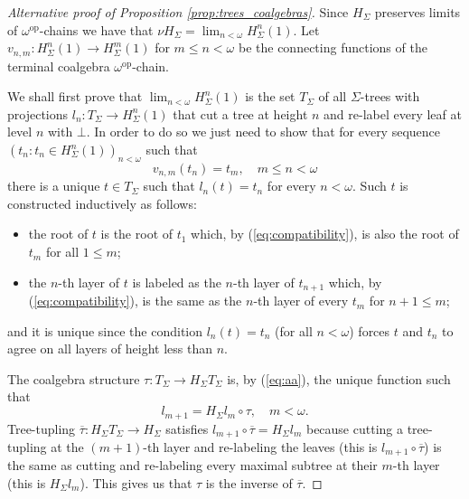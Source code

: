 \documentclass[letterpaper, 11pt, oneside]{memoir}
\theoremstyle{myteo}
\numberwithin{equation}{section}
\newcommand{\op}{\text{op}}
\begin{document}
\begin{proof}[Alternative proof of Proposition \ref{prop:trees_coalgebras}]
  Since \(H_\Sigma\) preserves limits of \(\omega^\op\)-chains we have that \(\nu H_\Sigma = \lim_{n < \omega}H^n_\Sigma(1)\).
  Let \(v_{n, m} : H^{n}_\Sigma(1) \to H^{m}_\Sigma(1)\) for \(m \leq n < \omega\) be the connecting functions of the terminal coalgebra \(\omega^\op\)-chain.

  We shall first prove that \(\lim_{n < \omega}H^n_\Sigma(1)\) is the set \(T_\Sigma\) of all \(\Sigma\)-trees with projections \(l_n: T_\Sigma \to H^n_\Sigma(1)\) that cut a tree at height \(n\) and re-label every leaf at level \(n\) with \(\bot\).
  In order to do so we just need to show that for every sequence \((t_n: t_n \in H^n_\Sigma(1))_{n<\omega}\) such that
  \begin{equation}
    \label{eq:compatibility}
    v_{n, m}(t_n) = t_m, \quad m \leq n < \omega
  \end{equation}
  there is a unique \(t \in T_\Sigma\) such that \(l_n(t) = t_n\) for every \(n<\omega\).
  Such \(t\) is constructed inductively as follows:
  \begin{itemize}
  \item the root of \(t\) is the root of \(t_1\) which, by (\ref{eq:compatibility}), is also the root of \(t_m\) for all \(1 \leq m\);
  \item the \(n\)-th layer of \(t\) is labeled as the \(n\)-th layer of \(t_{n + 1}\) which, by (\ref{eq:compatibility}), is the same as the \(n\)-th layer of every \(t_m\) for \(n + 1 \leq m\);
  \end{itemize}
  and it is unique since the condition \(l_n(t) = t_n\) (for all \(n < \omega\)) forces \(t\) and \(t_n\) to agree on all layers of height less than \(n\).

  The coalgebra structure \(\tau: T_\Sigma \to H_\Sigma T_\Sigma\) is, by (\ref{eq:aa}), the unique function such that
  \begin{equation*}
    \label{eq:treetuplingcondition}
    l_{m + 1} = H_\Sigma l_m \circ \tau, \quad m < \omega.
  \end{equation*}
  Tree-tupling \(\overline{\tau}: H_\Sigma T_\Sigma \to H_\Sigma\) satisfies \(l_{m + 1} \circ \overline{\tau} = H_\Sigma l_m\) because cutting a tree-tupling at the \((m + 1)\)-th layer and re-labeling the leaves (this is \(l_{m +1} \circ \overline{\tau}\)) is the same as cutting and re-labeling every maximal subtree at their \(m\)-th layer (this is \(H_\Sigma l_m\)).
  This gives us that \(\tau\) is the inverse of \(\overline{\tau}\).
\end{proof}
\end{document}
